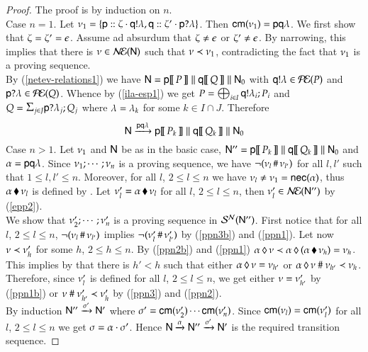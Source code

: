 \begin{proof}
  The proof is by induction on $n$.\\
  Case $n=1$.  Let
  $\nu_1=\{{\sf p}:: \zeta\cdot{\sf q}!\lambda,
{\sf q}:: \zeta'\cdot{\sf p}?\lambda\}$.
   Then  ${\sf cm}(\nu_1)={\sf p}{\sf q}\lambda$.  We first show
  that $\zeta=\zeta'=\epsilon$. Assume ad absurdum that
  $\zeta\neq\epsilon$  or  $\zeta'\neq\epsilon$. By narrowing, this
  implies that there is $\nu\in\mathcal{N\!E}({\sf N})$ such that
  $\nu\prec\nu_1$, 
 contradicting the fact that $\nu_1$ is a proving sequence.\\ 
By
  (\ref{netev-relations1}) we have
  ${\sf N}={\sf p}[\![\,P\,]\!]\mathrel{\|} {\sf q}[\![\,Q\,]\!]\mathrel{\|}{\sf N}_0$ with
  ${\sf q}!\lambda\in \mathcal{P\!E}(P)$ and ${\sf p}?\lambda\in\mathcal{P\!E}(Q)$.
  Whence by (\ref{ila-esp1}) we get
  $P=\bigoplus_{i\in I}{\sf q}!\lambda_i;P_i$ and $\Q=\inp\pp{j}{J}{\la}{\Q}$ where
  $\lambda = \lambda_k$ for some $k\in
  I \cap J$. Therefore 
\[
  {\sf N}\xrightarrow{{\sf p}{\sf q}\lambda}{\sf p}[\![\,P_k\,]\!]\mathrel{\|}
    {\sf q}[\![\,Q_k\,]\!]\mathrel{\|}{\sf N}_0
    \]
    Case $n>1$. Let $\nu_1$ and ${\sf N}$
  be as in the basic case, ${\sf N}''={\sf p}[\![\,P_k\,]\!]\mathrel{\|}
  {\sf q}[\![\,Q_k\,]\!]\mathrel{\|}{\sf N}_0 $ and $\alpha={\sf p}{\sf q}\lambda$.
 Since $\nu_1;\cdots;\nu_n$ is a proving sequence, we have
$\neg(\nu_l\,\#\,\nu_{l'})$ for all $l, l'$ such that $1\leq l, l'\leq n$. 
Moreover, for all $l$, $2\leq l\leq n$ we have
$\nu_l\not=\nu_1={\sf nec}(\alpha)$, thus
${\alpha}\,\blacklozenge\,{\nu_l}$ is defined by .  Let  $\nu_l'={\alpha}\,\blacklozenge\,{\nu_l}$ for all $l$, $2\leq l\leq n$,  then
$\nu_l'\in\mathcal{N\!E}({\sf N}'')$ by (\ref{epp2}).  
\\
 We show  that
$ \nu_2';\cdots;\nu_n'$   is a
proving sequence in $\mathcal{S}^{\mathcal{N}}({\sf N}'')$.  First notice that for all
$l$, $2\leq l\leq n$, $\neg(\nu_l\,\#\,\nu_{l'})$ implies
$\neg(\nu_l'\,\#\,\nu_{l'}')$ by 
(\ref{ppn3b}) and (\ref{ppn1}). Let now 
$\nu\prec\nu_h'$ for some $h$, $2\leq h\leq n$.  By
(\ref{ppn2b}) and (\ref{ppn1})
${\alpha}\,\lozenge\,{\nu}\prec{\alpha}\,\lozenge\,{({\alpha}\,\blacklozenge\,{\nu_h})}=\nu_h$. This
implies by  that there is $h'<h$ such that either
${\alpha}\,\lozenge\,{\nu}=\nu_{h'}$ or
${\alpha}\,\lozenge\,{\nu}~\#~\nu_{h'}\prec\nu_h$. Therefore, since
$\nu_l'$ is defined for all $l$, $2\leq l\leq n$, we get either $\nu=\nu_{h'}'$  by
(\ref{ppn1b})  or
$\nu~\#~\nu_{h'}'\prec\nu_h'$  by
(\ref{ppn3}) and
(\ref{ppn2}). \\
By induction ${\sf N}''\xrightarrow{\sigma'}{\sf N}'$ where
$\sigma'={\sf cm}(\nu_2')\cdots{\sf cm}(\nu_n')$.
Since ${\sf cm}(\nu_l)={\sf cm}(\nu_l')$ for all $l$,
$2\leq l\leq n$ we get $\sigma=\alpha\cdot\sigma'$.  Hence
${\sf N}\xrightarrow{\alpha} {\sf N}''\xrightarrow{\sigma'}{\sf N}'$ is the required
transition sequence.
\end{proof}
